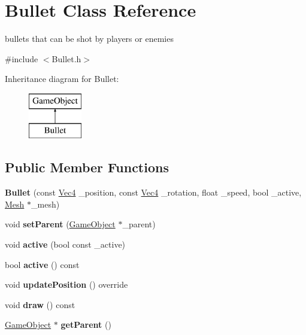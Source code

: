 \hypertarget{classBullet}{}\section{Bullet Class Reference}
\label{classBullet}


bullets that can be shot by players or enemies  




{\ttfamily \#include $<$Bullet.\+h$>$}

Inheritance diagram for Bullet\+:\begin{figure}[H]
\begin{center}
\leavevmode
\includegraphics[height=2.000000cm]{classBullet}
\end{center}
\end{figure}
\subsection*{Public Member Functions}
\begin{DoxyCompactItemize}
\item 
{\bfseries Bullet} (const \hyperlink{classVec4}{Vec4} \+\_\+position, const \hyperlink{classVec4}{Vec4} \+\_\+rotation, float \+\_\+speed, bool \+\_\+active, \hyperlink{classMesh}{Mesh} $\ast$\+\_\+mesh)\hypertarget{classBullet_a69a901bd61482d283deb9ba0815fe088}{}\label{classBullet_a69a901bd61482d283deb9ba0815fe088}

\item 
void {\bfseries set\+Parent} (\hyperlink{classGameObject}{Game\+Object} $\ast$\+\_\+parent)\hypertarget{classBullet_ab987516db817716708d347ff07a1ec00}{}\label{classBullet_ab987516db817716708d347ff07a1ec00}

\item 
void {\bfseries active} (bool const \+\_\+active)\hypertarget{classBullet_a7db83333ebb09d7ab2ac402b65df86b1}{}\label{classBullet_a7db83333ebb09d7ab2ac402b65df86b1}

\item 
bool {\bfseries active} () const \hypertarget{classBullet_ab984176acb53a108101208b02274efde}{}\label{classBullet_ab984176acb53a108101208b02274efde}

\item 
void {\bfseries update\+Position} () override\hypertarget{classBullet_aaf18157aae6a1e6d2296090bb705dd18}{}\label{classBullet_aaf18157aae6a1e6d2296090bb705dd18}

\item 
void {\bfseries draw} () const \hypertarget{classBullet_ac11bd30a1ad0a983504aed51525bed13}{}\label{classBullet_ac11bd30a1ad0a983504aed51525bed13}

\item 
\hyperlink{classGameObject}{Game\+Object} $\ast$ {\bfseries get\+Parent} ()\hypertarget{classBullet_a3393efe36b297d896b863993b28985d2}{}\label{classBullet_a3393efe36b297d896b863993b28985d2}

\end{DoxyCompactItemize}
